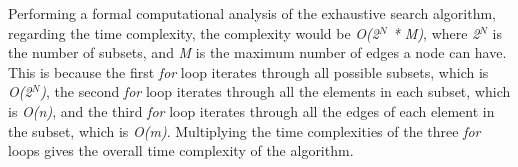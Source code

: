 \documentclass[...]{revdetua}
\begin{document}
Performing a formal computational analysis of the exhaustive search algorithm, regarding the time complexity, the complexity would be \textit{O(2$^N$ * M)}, where \textit{2$^N$} is the number of subsets, and \textit{M} is the maximum number of edges a node can have. This is because the first \textit{for} loop iterates through all possible subsets, which is \textit{O(2$^N$)}, the second \textit{for} loop iterates through all the elements in each subset, which is \textit{O(n)}, and the third \textit{for} loop iterates through all the edges of each element in the subset, which is \textit{O(m)}. Multiplying the time complexities of the three \textit{for} loops gives the overall time complexity of the algorithm.

\begin{figure}[htp]
\centering 




\end{figure}
\end{document}
